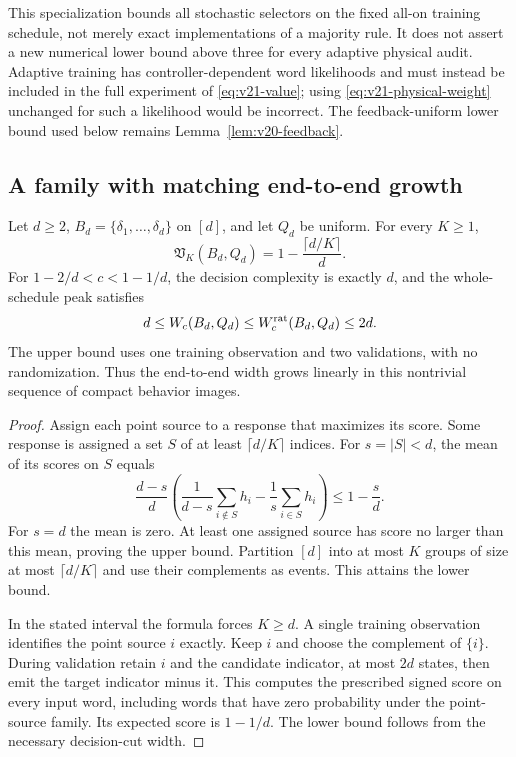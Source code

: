 This specialization bounds all stochastic selectors on the fixed all-on
training schedule, not merely exact implementations of a majority rule.
It does not assert a new numerical lower bound above three for every
adaptive physical audit. Adaptive training has controller-dependent
word likelihoods and must instead be included in the full experiment
of \eqref{eq:v21-value}; using \eqref{eq:v21-physical-weight} unchanged
for such a likelihood would be incorrect. The feedback-uniform lower
bound used below remains Lemma~\ref{lem:v20-feedback}.

\subsection{A family with matching end-to-end growth}
\begin{theorem}\label{thm:v21-point}
Let $d\ge2$, $B_d=\{\delta_1,\ldots,\delta_d\}$ on $[d]$, and let
$Q_d$ be uniform. For every $K\ge1$,
\begin{equation}\label{eq:v21-point}
 \mathfrak V_K(B_d,Q_d)=1-\frac{\lceil d/K\rceil}{d}.
\end{equation}
For $1-2/d<c<1-1/d$, the decision complexity is exactly $d$, and the
whole-schedule peak satisfies
\[
 d\le W_c(B_d,Q_d)\le W_c^{\rm rat}(B_d,Q_d)\le2d.
\]
The upper bound uses one training observation and two validations, with
no randomization. Thus the end-to-end width grows linearly in this
nontrivial sequence of compact behavior images.
\end{theorem}
\begin{proof}
Assign each point source to a response that maximizes its score. Some
response is assigned a set $S$ of at least $\lceil d/K\rceil$ indices.
For $s=|S|<d$, the mean of its scores on $S$ equals
\[
 \frac{d-s}{d}\left(
 \frac1{d-s}\sum_{i\notin S}h_i-\frac1s\sum_{i\in S}h_i\right)
 \le1-\frac{s}{d}.
\]
For $s=d$ the mean is zero. At least one assigned source has score no
larger than this mean, proving the upper bound. Partition $[d]$ into
at most $K$ groups of size at most $\lceil d/K\rceil$ and use their
complements as events. This attains the lower bound.

In the stated interval the formula forces $K\ge d$. A single training
observation identifies the point source $i$ exactly. Keep $i$ and choose
the complement of $\{i\}$. During validation retain $i$ and the candidate
indicator, at most $2d$ states, then emit the target indicator minus it.
This computes the prescribed signed score on every input word, including
words that have zero probability under the point-source family.
Its expected score is $1-1/d$. The lower bound follows from the necessary
decision-cut width.
\end{proof}

